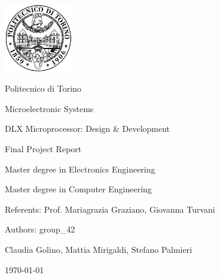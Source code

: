 \documentclass[10pt,  english, makeidx, a4paper, titlepage, oneside]{book}
\begin{document}
\frontmatter
\begin{titlepage}
\vspace{0cm}
\centerline{
\includegraphics[width=3cm]{./logopoli}} 
\vspace{0.5cm}
\centerline{\LARGE Politecnico di Torino}
\vspace{2.5cm}
\centerline{\huge\sf Microelectronic Systems}
\vspace{1cm}
\centerline{\Huge\sf DLX Microprocessor: Design \& Development}
\bigskip
\centerline{\huge\sf Final Project Report}
\vspace{2cm}
\centerline{\Large Master degree in Electronics Engineering}
\bigskip
\centerline{\Large Master degree in Computer Engineering}
\vspace{4.5cm}
%
\centerline{\large Referents: Prof. Mariagrazia Graziano, Giovanna Turvani}
\bigskip
\vspace{1cm}
%
%
\centerline{\large Authors: group\_42}
\bigskip
%
%
\centerline{\large Claudia Golino, Mattia Mirigaldi, Stefano Palmieri}
%
\vspace{2cm}
\centerline{\large \today}
\end{titlepage}

\tableofcontents

\mainmatter
%    
%



% 
%
%    
%
\appendix

% 
%
\end{document}
